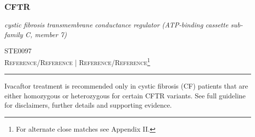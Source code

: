 \documentclass{report}
\begin{document}
\subsubsection{ CFTR }
     \textit{ cystic fibrosis transmembrane conductance regulator (ATP-binding cassette sub-family C, member 7) } \begin{flushright} \textsc{ STE0097 \\ Reference/Reference  | Reference/Reference\footnote{For alternate close matches see Appendix II.} }\end{flushright}
      \hrule \vspace{6pt}
      Ivacaftor treatment is recommended only in cystic fibrosis (CF) patients that are either homozygous or heterozygous for certain CFTR variants.  See full guideline for disclaimers, further details and supporting evidence. \newline
      \scriptsize
      
\end{document}
